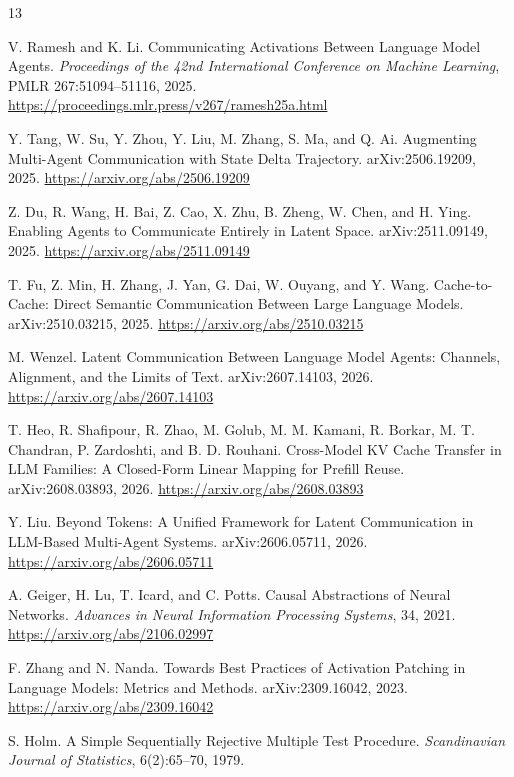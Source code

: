 \documentclass[11pt]{article}
\begin{document}
\clearpage

\begin{thebibliography}{13}

V. Ramesh and K. Li.
Communicating Activations Between Language Model Agents.
\emph{Proceedings of the 42nd International Conference on Machine Learning}, PMLR 267:51094--51116, 2025.
\url{https://proceedings.mlr.press/v267/ramesh25a.html}

Y. Tang, W. Su, Y. Zhou, Y. Liu, M. Zhang, S. Ma, and Q. Ai.
Augmenting Multi-Agent Communication with State Delta Trajectory.
arXiv:2506.19209, 2025.
\url{https://arxiv.org/abs/2506.19209}

Z. Du, R. Wang, H. Bai, Z. Cao, X. Zhu, B. Zheng, W. Chen, and H. Ying.
Enabling Agents to Communicate Entirely in Latent Space.
arXiv:2511.09149, 2025.
\url{https://arxiv.org/abs/2511.09149}

T. Fu, Z. Min, H. Zhang, J. Yan, G. Dai, W. Ouyang, and Y. Wang.
Cache-to-Cache: Direct Semantic Communication Between Large Language Models.
arXiv:2510.03215, 2025.
\url{https://arxiv.org/abs/2510.03215}

M. Wenzel.
Latent Communication Between Language Model Agents: Channels, Alignment, and the Limits of Text.
arXiv:2607.14103, 2026.
\url{https://arxiv.org/abs/2607.14103}

T. Heo, R. Shafipour, R. Zhao, M. Golub, M. M. Kamani, R. Borkar, M. T. Chandran, P. Zardoshti, and B. D. Rouhani.
Cross-Model KV Cache Transfer in LLM Families: A Closed-Form Linear Mapping for Prefill Reuse.
arXiv:2608.03893, 2026.
\url{https://arxiv.org/abs/2608.03893}

Y. Liu.
Beyond Tokens: A Unified Framework for Latent Communication in LLM-Based Multi-Agent Systems.
arXiv:2606.05711, 2026.
\url{https://arxiv.org/abs/2606.05711}

A. Geiger, H. Lu, T. Icard, and C. Potts.
Causal Abstractions of Neural Networks.
\emph{Advances in Neural Information Processing Systems}, 34, 2021.
\url{https://arxiv.org/abs/2106.02997}

F. Zhang and N. Nanda.
Towards Best Practices of Activation Patching in Language Models: Metrics and Methods.
arXiv:2309.16042, 2023.
\url{https://arxiv.org/abs/2309.16042}

S. Holm.
A Simple Sequentially Rejective Multiple Test Procedure.
\emph{Scandinavian Journal of Statistics}, 6(2):65--70, 1979.


\end{thebibliography}
\end{document}

